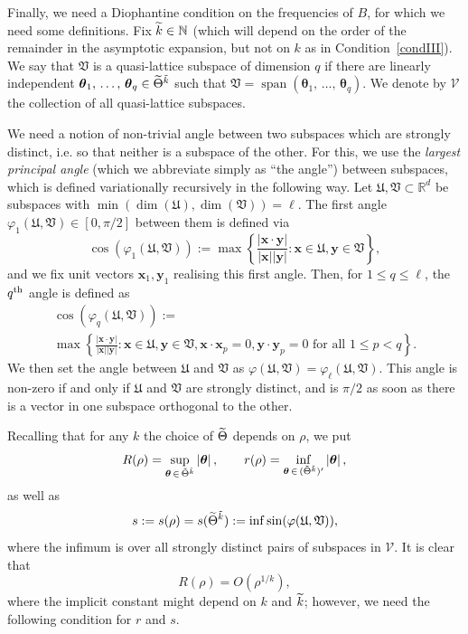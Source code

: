 \documentclass[10pt]{amsart}
\theoremstyle{definition}\newtheorem{defi}[theo]{Definition}\newtheorem{rema}[theo]{Remark}\newtheorem{exam}[theo]{Example}\newtheorem{nota}[theo]{Notation}
\DeclareMathOperator{\spann}{span}
\newcommand{\R}{\mathbb R}
\newcommand{\N}{\mathbb N}
\newcommand{\CV}{\mathcal{V}}
\newcommand{\btheta}{\boldsymbol \theta}
\newcommand{\bx}{\mathbf x}
\newcommand{\by}{\mathbf y}
\newcommand{\FU}{\mathfrak U}
\newcommand{\FV}{\mathfrak V}
\renewcommand{\phi}{\varphi}
\newcommand{\bigo}[1]{O\left(#1 \right)}
\newcommand{\abs}[1]{\left\lvert #1 \right\rvert}
\newcommand{\set}[1]{\left\{ #1 \right\}}
\let\oldtilde\tilde
\renewcommand*{\tilde}[1]{\mathchoice{\widetilde{#1}}{\widetilde{#1}}{\oldtilde{#1}}{\oldtilde{#1}}}
\begin{document}
Finally, we need a Diophantine condition on the frequencies of $B$, for which we need some definitions. Fix $\tilde k \in \N$ (which will depend on the order of the remainder in the asymptotic expansion, but not on $k$ as in Condition~\ref{condIII}). We say that $\FV$ is a quasi-lattice subspace of dimension $q$ if there are linearly independent $\btheta_1,\,\dotsc,\,\btheta_q \in \tilde \Theta^{\tilde k}$ such that $\FV = \spann(\btheta_1,\,\dotsc,\,\btheta_q)$. We denote by $\CV$ the collection of all quasi-lattice subspaces.

We need a notion of non-trivial angle between two subspaces which are strongly distinct, i.e. so that neither is a subspace of the other. For this, we use the
\emph{largest principal angle} (which we abbreviate simply as ``the angle'') between subspaces, which is defined variationally recursively in the following way. Let $\FU, \FV \subset \R^d$ be subspaces with $\min(\dim(\FU),\dim(\FV)) = \ell$. The first angle $\phi_1(\FU,\FV) \in [0,\pi/2]$ between them is defined via
\begin{equation}
\cos(\phi_1(\FU,\FV)) := \max \set{\frac{\abs{\bx \cdot \by}}{\abs \bx \abs \by} : \bx \in \FU, \by \in \FV},
\end{equation}
and we fix unit vectors $\bx_1, \by_1$ realising this first angle. Then, for $1
\le q \le \ell$, the $q^{\rm th}$ angle is defined as
\begin{multline}
\cos(\phi_q(\FU,\FV)) :=\\
\max \set{\frac{\abs{\bx \cdot \by}}{\abs \bx \abs \by} : \bx \in \FU, \by \in \FV, \bx \cdot \bx_p = 0, \by \cdot \by_p = 0
\text{ for all } 1 \le p < q}.
\end{multline}
We then set the angle between $\FU$ and $\FV$ as $\phi(\FU,\FV) =
\phi_\ell(\FU,\FV)$. This angle is non-zero if and only if $\FU$ and $\FV$ are strongly distinct, and is $\pi/2$ as soon as there is a vector in one subspace orthogonal to the other.

Recalling that for any $k$ the choice of $\tilde \Theta$ depends on $\rho$, we put
\begin{equation}\label{eq:defnrR}
R(\rho) = \sup_{\btheta\,\in\,\tilde \Theta^{\tilde k}} \abs \btheta, \qquad r(\rho) = \inf_{\btheta\,\in\,(\tilde \Theta^{\tilde k})'} \abs \btheta,
\end{equation}
as well as
\begin{equation}
s := s(\rho) = s(\tilde \Theta^{\tilde k}) := \inf \sin(\phi(\FU,\FV)),
\end{equation}
where the infimum is over all strongly distinct pairs of subspaces in $\CV$. It is clear that
\begin{equation}\label{eq:boundonR}
R(\rho) = \bigo{\rho^{1/k}},
\end{equation}
where the implicit constant might depend on $k$ and $\tilde k$; however, we need the following condition for $r$ and $s$.
\end{document}
